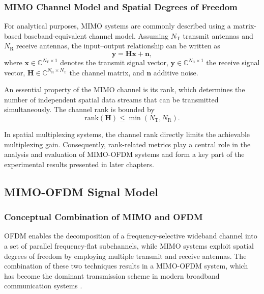 \subsubsection{MIMO Channel Model and Spatial Degrees of Freedom}

For analytical purposes, MIMO systems are commonly described using a matrix-based baseband-equivalent channel model. Assuming $N_\mathrm{T}$ transmit antennas and $N_\mathrm{R}$ receive antennas, the input--output relationship can be written as
\begin{equation}
\mathbf{y} = \mathbf{H}\mathbf{x} + \mathbf{n},
\end{equation}
where $\mathbf{x} \in \mathbb{C}^{N_\mathrm{T} \times 1}$ denotes the transmit signal vector, $\mathbf{y} \in \mathbb{C}^{N_\mathrm{R} \times 1}$ the receive signal vector, $\mathbf{H} \in \mathbb{C}^{N_\mathrm{R} \times N_\mathrm{T}}$ the channel matrix, and $\mathbf{n}$ additive noise.

An essential property of the MIMO channel is its rank, which determines the number of independent spatial data streams that can be transmitted simultaneously. The channel rank is bounded by
\begin{equation}
\mathrm{rank}(\mathbf{H}) \leq \min(N_\mathrm{T}, N_\mathrm{R}).
\end{equation}

In spatial multiplexing systems, the channel rank directly limits the achievable multiplexing gain. Consequently, rank-related metrics play a central role in the analysis and evaluation of MIMO-OFDM systems and form a key part of the experimental results presented in later chapters.

\subsection{MIMO-OFDM Signal Model}

\subsubsection{Conceptual Combination of MIMO and OFDM}

OFDM enables the decomposition of a frequency-selective wideband channel into a set of parallel frequency-flat subchannels, while MIMO systems exploit spatial degrees of freedom by employing multiple transmit and receive antennas. The combination of these two techniques results in a MIMO-OFDM system, which has become the dominant transmission scheme in modern broadband communication systems \cite{nee2000ofdm,tse2005fundamentals}.

